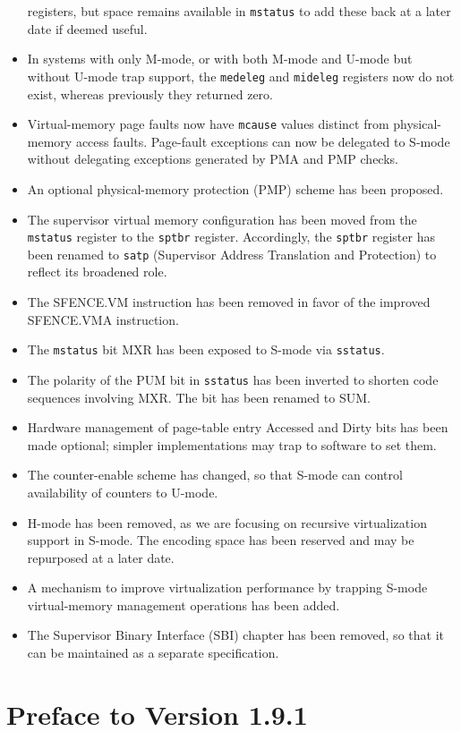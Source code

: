 \begin{itemize}
  registers, but space remains available in {\tt mstatus} to add these
  back at a later date if deemed useful.
\item In systems with only M-mode, or with both M-mode and U-mode but
  without U-mode trap support, the {\tt medeleg} and {\tt mideleg}
    registers now do not exist, whereas previously they returned zero.
\item Virtual-memory page faults now have {\tt mcause} values distinct from
  physical-memory access faults.  Page-fault exceptions can now be
  delegated to S-mode without delegating exceptions generated by PMA
  and PMP checks.
\item An optional physical-memory protection (PMP) scheme has been proposed.
\item The supervisor virtual memory configuration has been moved from the
  {\tt mstatus} register to the {\tt sptbr} register.  Accordingly, the
  {\tt sptbr} register has been renamed to {\tt satp} (Supervisor Address
  Translation and Protection) to reflect its broadened role.
\item The SFENCE.VM instruction has been removed in favor of the improved
  SFENCE.VMA instruction.
\item The {\tt mstatus} bit MXR has been exposed to S-mode via {\tt sstatus}.
\item The polarity of the PUM bit in {\tt sstatus} has been inverted to
  shorten code sequences involving MXR.  The bit has been renamed to SUM.
\item Hardware management of page-table entry Accessed and Dirty bits has
  been made optional; simpler implementations may trap to software to
  set them.
\item The counter-enable scheme has changed, so that S-mode can
  control availability of counters to U-mode.
\item H-mode has been removed, as we are focusing on recursive
  virtualization support in S-mode.  The encoding space has been
  reserved and may be repurposed at a later date.
\item A mechanism to improve virtualization performance by
  trapping S-mode virtual-memory management operations has been added.
\item The Supervisor Binary Interface (SBI) chapter has been removed, so
  that it can be maintained as a separate specification.
\end{itemize}

\newpage

\section*{Preface to Version 1.9.1}

